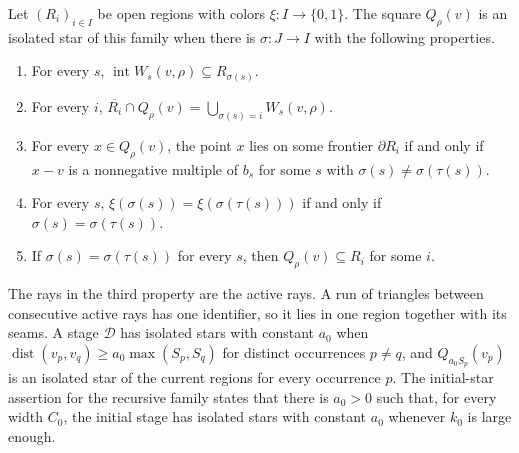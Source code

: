\begin{definition}
    \label{def:area_law_isolated_star}
    \leanok
    Let $(R_i)_{i\in I}$ be open regions with colors
    $\xi:I\to\{0,1\}$. The square $Q_\rho(v)$ is an isolated star of
    this family when there is $\sigma:J\to I$ with the following
    properties.
    \begin{enumerate}
        \item For every $s$, $\operatorname{int}W_s(v,\rho)\subseteq
                  R_{\sigma(s)}$.
        \item For every $i$,
              $\overline{R_i}\cap Q_\rho(v)
                  =\bigcup_{\sigma(s)=i}W_s(v,\rho)$.
        \item For every $x\in Q_\rho(v)$, the point $x$ lies on some
              frontier $\partial R_i$ if and only if $x-v$ is a
              nonnegative multiple of $b_s$ for some $s$ with
              $\sigma(s)\ne\sigma(\tau(s))$.
        \item For every $s$, $\xi(\sigma(s))=\xi(\sigma(\tau(s)))$ if
              and only if $\sigma(s)=\sigma(\tau(s))$.
        \item If $\sigma(s)=\sigma(\tau(s))$ for every $s$, then
              $Q_\rho(v)\subseteq R_i$ for some $i$.
    \end{enumerate}
    The rays in the third property are the active rays. A run of
    triangles between consecutive active rays has one identifier, so it
    lies in one region together with its seams. A stage
    $\mathcal D$ has isolated stars with constant $a_0$ when
    $\operatorname{dist}(v_p,v_q)\ge a_0\max(S_p,S_q)$ for distinct
    occurrences $p\ne q$, and $Q_{a_0S_p}(v_p)$ is an isolated star of
    the current regions for every occurrence $p$. The initial-star
    assertion for the recursive family states that there is $a_0>0$ such
    that, for every width $C_0$, the initial stage has isolated stars
    with constant $a_0$ whenever $k_0$ is large enough.
\end{definition}


